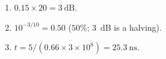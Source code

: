 \begin{enumerate}[leftmargin=1.6em,itemsep=2pt]
\item $0.15\times20 = 3\ \text{dB}$.
\item $10^{-3/10} = 0.50$ ($50\%$; $3$~dB is a halving).
\item $t = 5/(0.66\times3\times10^{8}) = 25.3\ \text{ns}$.
\end{enumerate}
